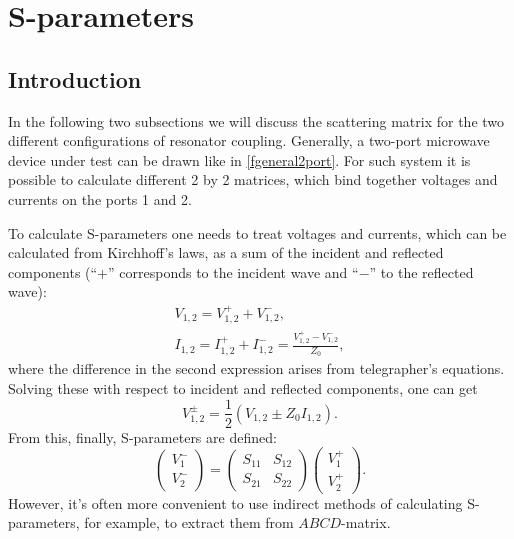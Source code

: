 \documentclass[12pt]{report}
\newcommand{\rbrkt}[1]{\left( #1 \right)}
\numberwithin{equation}{section}
\begin{document}
\section{S-parameters}

\subsection{Introduction}

In the following two subsections we will discuss the scattering matrix for the two different configurations of resonator coupling. Generally, a two-port microwave device under test can be drawn like in \autoref{fgeneral2port}. For such system it is possible to calculate different 2 by 2 matrices, which bind together voltages and currents on the ports 1 and 2.

To calculate S-parameters one needs to treat voltages and currents, which can be calculated from Kirchhoff's laws, as a sum of the incident and reflected components (``+'' corresponds to the incident wave and ``$-$'' to the reflected wave):
\begin{gather*}
V_{1,2} = V_{1,2}^+ + V_{1,2}^- ,\\
I_{1,2} = I_{1,2}^+ + I_{1,2}^- = \frac{ V_{1,2}^+ - V_{1,2}^- }{Z_0},
\end{gather*}
where the difference in the second expression arises from telegrapher's equations. Solving these with respect to incident and reflected components, one can get
\begin{equation*}
V_{1,2}^\pm = \frac{1}{2}(V_{1,2} \pm Z_0 I_{1,2}).
\end{equation*}
From this, finally, S-parameters are defined:
\begin{equation}
\rbrkt{\begin{matrix}
V_1^- \\
V_2^-
\end{matrix}} = 
\rbrkt{\begin{matrix}
S_{11} & S_{12} \\
S_{21} & S_{22}
\end{matrix}}
\rbrkt{\begin{matrix}
V_1^+ \\
V_2^+
\end{matrix}}.
\label{eq:S_def}
\end{equation}
However, it's often more convenient to use indirect methods of calculating S-parameters, for example, to extract them from $ABCD$-matrix.
\end{document}
